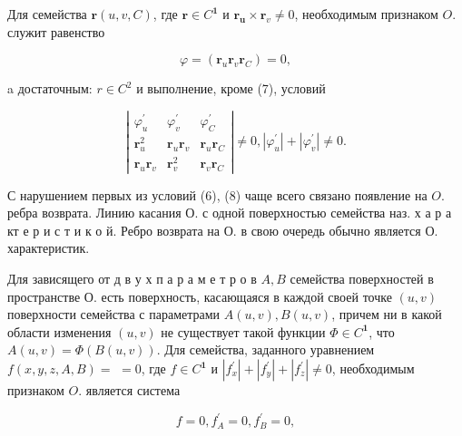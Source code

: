 \documentclass[10pt]{article}
\begin{document}
Для семейства $\boldsymbol{r}(u, v, C)$, где $\boldsymbol{r} \in C^{\mathbf{1}}$ и $\boldsymbol{r}_{\boldsymbol{u}} \times \boldsymbol{r}_{v} \neq 0$, необходимым признаком $O$. служит равенство



\[

\varphi=\left(\boldsymbol{r}_{u} \boldsymbol{r}_{v} \boldsymbol{r}_{C}\right)=0,

\]



a достаточным: $r \in C^{2}$ и выполнение, кроме (7), условий



\[

\left|\begin{array}{ccc}

\varphi_{u}^{\prime} & \varphi_{v}^{\prime} & \varphi_{C}^{\prime} \\

\boldsymbol{r}_{u}^{2} & \boldsymbol{r}_{u} \boldsymbol{r}_{v} & \boldsymbol{r}_{u} \boldsymbol{r}_{C} \\

\boldsymbol{r}_{u} \boldsymbol{r}_{v} & \boldsymbol{r}_{v}^{2} & \boldsymbol{r}_{v} \boldsymbol{r}_{C}

\end{array}\right| \neq 0,\left|\varphi_{u}^{\prime}\right|+\left|\varphi_{v}^{\prime}\right| \neq 0 .

\]



С нарушением первых из условий (6), (8) чаще всего связано появление на $O$. ребра возврата. Линию касания О. с одной поверхностью семейства наз. х а р а кт е р и с т и к о й. Ребро возврата на О. в свою очередь обычно является О. характеристик.



Для зависящего от д в у х п а р а м е т р о в $A, B$ семейства поверхностей в пространстве О. есть поверхность, касающаяся в каждой своей точке $(u, v)$ поверхности семейства с параметрами $A(u, v), B(u, v)$, причем ни в какой области изменения $(u, v)$ не существует такой функции $\Phi \in C^{\mathbf{1}}$, что $A(u, v)=\Phi(B(u, v))$. Для семейства, заданного уравнением $f(x, y, z, A, B)=$ $=0$, где $f \in C^{\mathbf{1}}$ и $\left|f_{x}^{\prime}\right|+\left|f_{y}^{\prime}\right|+\left|f_{z}^{\prime}\right| \neq 0$, необходимым признаком $O$. является система



\[

f=0, f_{A}^{\prime}=0, f_{B}^{\prime}=0,

\]
\end{document}
